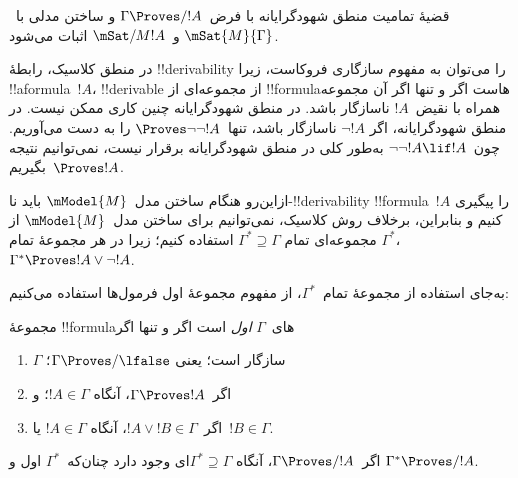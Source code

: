 \documentclass[../../../include/open-logic-section]{subfiles}
\begin{document}


قضیهٔ تمامیت منطق شهودگرایانه با فرض~$\Gamma \Proves/ !A$ و ساختن
مدلی با~$\mSat{M}{\Gamma}$ و~$\mSat/{M}{!A}$ اثبات می‌شود.

در منطق کلاسیک، رابطهٔ !!{derivability} را می‌توان به مفهوم سازگاری
فروکاست، زیرا !!a{formula}~$!A$، !!{derivable} از مجموعه‌ای از
!!{formula}هاست اگر و تنها اگر آن مجموعه همراه با نقیض~$!A$ ناسازگار
باشد. در منطق شهودگرایانه چنین کاری ممکن نیست. در منطق شهودگرایانه، اگر
$\lnot!A$ ناسازگار باشد، تنها~$\Proves \lnot\lnot !A$ را به دست
می‌آوریم. چون~$\lnot\lnot!A \lif !A$ به‌طور کلی در منطق شهودگرایانه
برقرار نیست، نمی‌توانیم نتیجه بگیریم~$\Proves !A$.

ازاین‌رو هنگام ساختن مدل~$\mModel{M}$ باید نا-!!{derivability}ِ
!!{formula}~$!A$ را پیگیری کنیم و بنابراین، برخلاف روش کلاسیک،
نمی‌توانیم برای ساختن مدل~$\mModel{M}$ از مجموعه‌ای تمام
$\Gamma^* \supseteq \Gamma$ استفاده کنیم؛ زیرا در هر مجموعهٔ تمام
$\Gamma^*$، $\Gamma^* \Proves !A \lor \lnot !A$.

به‌جای استفاده از مجموعهٔ تمام~$\Gamma^*$، از مفهوم مجموعهٔ اول فرمول‌ها
استفاده می‌کنیم:

\begin{defn}
  مجموعهٔ !!{formula}های~$\Gamma$ \emph{اول} است اگر و تنها اگر
  \begin{enumerate}
  \item{} $\Gamma$ سازگار است؛ یعنی
    $\Gamma \Proves/ \lfalse$؛
  \item{} اگر~$\Gamma \Proves !A$، آنگاه
    $!A \in \Gamma$؛ و
  \item{} اگر~$!A \lor !B \in \Gamma$، آنگاه
    $!A \in \Gamma$ یا~$!B \in \Gamma$.
  \end{enumerate}
\end{defn}

\begin{lem}[لم لیندنباوم]
   اگر~$\Gamma \Proves/ !A$، آنگاه
  $\Gamma^* \supseteq \Gamma$ای وجود دارد چنان‌که~$\Gamma^*$ اول و
  $\Gamma^* \Proves/ !A$.
\end{lem}
\end{document}
